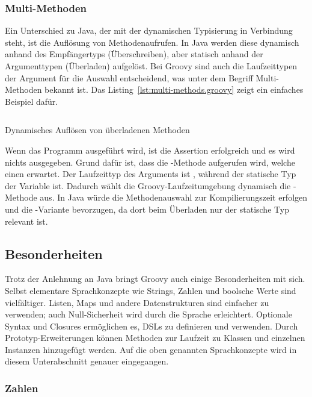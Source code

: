 \documentclass[a4paper]{article}
\newcommand{\codelisting}[3]{
\begin{listing}[ht]
	\inputminted{#1}{#1/#2}
	\vspace{-3ex}
	\caption{#3}
	\label{lst:#2}
\end{listing}
}
\begin{document}
\subsubsection{Multi-Methoden}

Ein Unterschied zu Java, der mit der dynamischen Typisierung in Verbindung steht, ist die Auflösung von Methodenaufrufen.
In Java werden diese dynamisch anhand des Empfängertyps (Überschreiben), aber statisch anhand der Argumenttypen (Überladen) aufgelöst.
Bei Groovy sind auch die Laufzeittypen der Argument für die Auswahl entscheidend, was unter dem Begriff Multi-Methoden bekannt ist.
Das Listing~\ref{lst:multi-methods.groovy} zeigt ein einfaches Beispiel dafür.

\codelisting{groovy}{multi-methods.groovy}{Dynamisches Auflösen von überladenen Methoden}

Wenn das Programm ausgeführt wird, ist die Assertion erfolgreich und es wird nichts ausgegeben.
Grund dafür ist, dass die -Methode aufgerufen wird, welche einen  erwartet.
Der Laufzeittyp des Arguments  ist , während der statische Typ der Variable  ist.
Dadurch wählt die Groovy-Laufzeitumgebung dynamisch die -Methode aus.
In Java würde die Methodenauswahl zur Kompilierungszeit erfolgen und die -Variante bevorzugen, da dort beim Überladen nur der statische Typ relevant ist.

\subsection{Besonderheiten}\label{subsec:besonderheiten}

Trotz der Anlehnung an Java bringt Groovy auch einige Besonderheiten mit sich.
Selbst elementare Sprachkonzepte wie Strings, Zahlen und boolsche Werte sind vielfältiger.
Listen, Maps und andere Datenstrukturen sind einfacher zu verwenden; auch Null-Sicherheit wird durch die Sprache erleichtert.
Optionale Syntax und Closures ermöglichen es, DSLs zu definieren und verwenden.
Durch Prototyp-Erweiterungen können Methoden zur Laufzeit zu Klassen und einzelnen Instanzen hinzugefügt werden.
Auf die oben genannten Sprachkonzepte wird in diesem Unterabschnitt genauer eingegangen.

\subsubsection{Zahlen}\label{subsubsec:zahlen}
\end{document}
